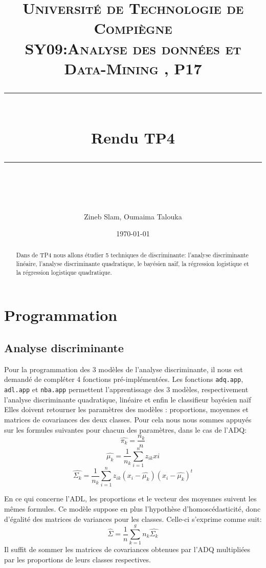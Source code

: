 \documentclass[10pt]{article}
\title{
	\normalfont \normalsize 
	\textsc{Université de Technologie de Compiègne\\ 
		SY09:Analyse des données et Data-Mining , P17} \\
	[10pt]
	\rule{\linewidth}{0.5pt} \\[6pt] 
	\huge Rendu TP4\\
	\rule{\linewidth}{2pt}  \\[10pt]
}
\author{Zineb Slam, Oumaima Talouka}
\date{\normalsize \today}
\begin{document}
	{\let\newpage\relax\maketitle}	
	
		\begin{abstract}
			Dans de TP4 nous allons étudier 5 techniques de discriminante: l'analyse discriminante linéaire, l'analyse discriminante quadratique, le bayésien naïf, la régression logistique et la régression logistique quadratique. 
		\end{abstract}
	

\section{Programmation}
	\subsection{Analyse discriminante}
	Pour la programmation des 3 modèles de l'analyse discriminante, il nous est demandé de compléter 4 fonctions pré-implémentées.
	Les fonctions \texttt{adq.app}, \texttt{adl.app} et \texttt{nba.app} permettent l'apprentissage des 3 modèles, respectivement l'analyse discriminante quadratique, linéaire et enfin le classifieur bayésien naïf Elles doivent retourner les paramètres des modèles : proportions, moyennes et matrices de covariances des deux classes. Pour cela nous nous sommes appuyés sur les formules suivantes pour chacun des paramètres, dans le cas de l'ADQ: 
	\begin{equation*}
	\widehat{\pi_{k}} = \dfrac{n_{k}}{n}
	\end{equation*}	
	\begin{equation*}
	\widehat{\mu_{k}} = \dfrac{1}{n_{k}}\sum_{i=1}^{n} z_{ik}x{i}
	\end{equation*}
	\begin{equation*}
	\widehat{\Sigma_{k}} = \dfrac{1}{n_{k}}\sum_{i=1}^{n} z_{ik} (x_{i}-\widehat{\mu_{k}})(x_{i}-\widehat{\mu_{k}})^{t}
	\end{equation*} 
	
	En ce qui concerne l'ADL, les proportions et le vecteur des moyennes suivent les mêmes formules. Ce modèle suppose en plus l'hypothèse d'homoscédasticité, donc d'égalité des matrices de variances pour les classes. Celle-ci s'exprime comme suit: 
	\begin{equation*}
	\widehat{\Sigma} = \dfrac{1}{n}\sum_{k=1}^{g} n_{k} \widehat{\Sigma_{k}}
	\end{equation*}	
	Il suffit de sommer les matrices de covariances obtenues par l'ADQ multipliées par les proportions de leurs classes respectives.
	
\end{document}
